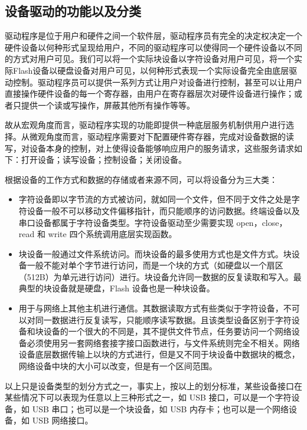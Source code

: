 \subsection{设备驱动的功能以及分类}\label{sec:设备分类}
	驱动程序是位于用户和硬件之间一个软件层，驱动程序员有完全的决定权决定一个硬件设备以何种形式呈现给用户，不同的驱动程序可以使得同一个硬件设备以不同的方式对用户可见。我们可以将一个实际块设备以字符设备对用户可见，将一个实际Flash设备以硬盘设备对用户可见，以何种形式表现一个实际设备完全由底层驱动控制。驱动程序员可以提供一系列方式让用户对设备进行控制，甚至可以让用户直接操作硬件设备的每一个寄存器，由用户在寄存器层次对硬件设备进行操作；或者只提供一个读或写操作，屏蔽其他所有操作等等。
	
	故从宏观角度而言，驱动程序实现的功能即提供一种底层服务机制供用户进行选择。从微观角度而言，驱动程序需要对下配置硬件寄存器，完成对设备数据的读写，对设备本身的控制，对上使得设备能够响应用户的服务请求，这些服务请求如下：打开设备；读写设备；控制设备；关闭设备。

	根据设备的工作方式和数据的存储或者来源不同，可以将设备分为三大类：
\begin{itemize}
\item {}

	字符设备即以字节流的方式被访问，就如同一个文件，但不同于文件之处是字符设备一般不可以移动文件偏移指针，而只能顺序的访问数据。终端设备以及串口设备都属于字符设备类型。字符设备驱动至少需要实现 open，close，read 和 write 四个系统调用底层实现函数。

\item {}

	块设备一般通过文件系统访问。而块设备的最多使用方式也是文件方式。块设备一般不能对单个字节进行访问，而是一个块的方式（如硬盘以一个扇区（512B）为单元进行访问）进行。块设备允许同一数据的反复读取和写入。最典型的块设备就是硬盘，Flash 设备也是一种块设备。
	
\item {}

	用于与网络上其他主机进行通信。其数据读取方式有些类似于字符设备，不可以对同一数据进行反复读写，只能顺序读写数据。且该类型设备区别于字符设备和块设备的一个很大的不同是，其不提供文件节点，任务要访问一个网络设备必须使用另一套网络套接字接口函数进行，与文件系统则完全不相关。网络设备底层数据传输上以块的方式进行，但是又不同于块设备中数据块的概念，网络设备中块的大小可以改变，但是有一个区间范围。
\end{itemize}

	以上只是设备类型的划分方式之一，事实上，按以上的划分标准，某些设备接口在某些情况下可以表现为任意以上三种形式之一，如 USB 接口，可以是一个字符设备，如 USB 串口；也可以是一个块设备，如 USB 内存卡；也可以是一个网络设备，如 USB 网络接口。

